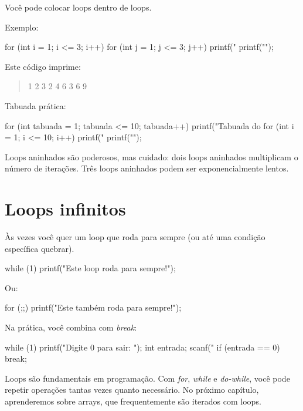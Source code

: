 Você pode colocar loops dentro de loops.

Exemplo:

\begin{ccode}
  for (int i = 1; i <= 3; i++) {
    for (int j = 1; j <= 3; j++) {
      printf("%
    }
    printf("\n");
  }
\end{ccode}

Este código imprime:

\begin{quote}
  1 2 3
  2 4 6
  3 6 9
\end{quote}

Tabuada prática:

\begin{ccode}
  for (int tabuada = 1; tabuada <= 10; tabuada++) {
    printf("Tabuada do %
    for (int i = 1; i <= 10; i++) {
      printf("%
    }
    printf("\n");
  }
\end{ccode}

Loops aninhados são poderosos, mas cuidado: dois loops aninhados multiplicam o número de iterações. Três loops aninhados podem ser exponencialmente lentos.

\section{Loops infinitos}

Às vezes você quer um loop que roda para sempre (ou até uma condição específica quebrar).

\begin{ccode}
  while (1) {
    printf("Este loop roda para sempre!\n");
  }
\end{ccode}

Ou:

\begin{ccode}
  for (;;) {
    printf("Este também roda para sempre!\n");
  }
\end{ccode}

Na prática, você combina com \textit{break}:

\begin{ccode}
  while (1) {
    printf("Digite 0 para sair: ");
    int entrada;
    scanf("%
    if (entrada == 0) {
      break;
    }
  }
\end{ccode}

Loops são fundamentais em programação. Com \textit{for}, \textit{while} e \textit{do-while}, você pode repetir operações tantas vezes quanto necessário. No próximo capítulo, aprenderemos sobre arrays, que frequentemente são iterados com loops.




